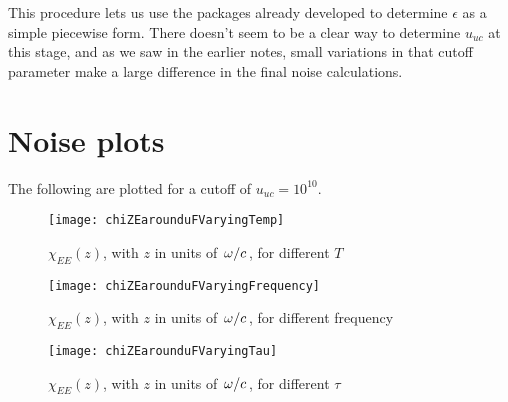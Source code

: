 \documentclass[11pt]{article}
\begin{document}
	This procedure lets us use the packages already developed to determine $\epsilon$ as a simple piecewise form.
	There doesn't seem to be a clear way to determine $u_{uc}$ at this stage, and as we saw in the earlier notes, small variations in that cutoff parameter make a large difference in the final noise calculations.

	\section{Noise plots} \label{sec:plots}

	The following are plotted for a cutoff of $u_{uc} = 10^{10}$.

	\begin{figure}[htp]
		\centering
		\texttt{[image: chiZEarounduFVaryingTemp]}
		\caption{$\chi_{EE}(z)$, with $z$ in units of $\flatfrac{\omega}{c}$, for different $T$} \label{fig:temp}
	\end{figure}

	\begin{figure}[htp]
		\centering
		\texttt{[image: chiZEarounduFVaryingFrequency]}
		\caption{$\chi_{EE}(z)$, with $z$ in units of $\flatfrac{\omega}{c}$, for different frequency} \label{fig:frequency}
	\end{figure}

	\begin{figure}[htp]
		\centering
		\texttt{[image: chiZEarounduFVaryingTau]}
		\caption{$\chi_{EE}(z)$, with $z$ in units of $\flatfrac{\omega}{c}$, for different $\tau$} \label{fig:tau}
	\end{figure}

	\newpage
	\listoftodos
	\newpage
	\printbibliography
\end{document}
